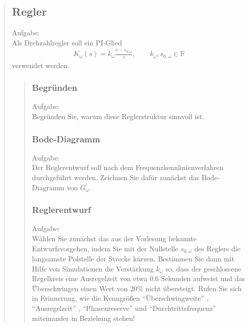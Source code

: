 \begin{quote}
\begin{quote}
        
	\end{quote}
	
	\subsection{Regler}
    Aufgabe:\\
    Als Drehzahlregler soll ein PI-Glied\\
    \begin{equation*}
        \begin{split}
            K_\omega (s) = k_\omega \frac{s-s_{0,\omega}}{s}, \hspace{2em} k_\omega, s_{0,\omega} \in \mathbb{R}
        \end{split}
    \end{equation*}
    verwendet werden.
	\begin{quote}
		
		\subsubsection{Begründen}
        Aufgabe:\\
        Begründen Sie, warum diese Reglerstruktur sinnvoll ist.\\
		\begin{quote}
			
		\end{quote}
		
		\subsubsection{Bode-Diagramm}
        Aufgabe:\\
        Der Reglerentwurf soll nach dem Frequenzkennlinienverfahren durchgeführt werden. Zeichnen Sie dafür zunächst
        das Bode-Diagramm von $G_\omega^{'}$.\\   
        \begin{quote}
                        
        \end{quote}

        \subsubsection{Reglerentwurf}
        Aufgabe:\\        
        Wählen Sie zunächst das aus der Vorlesung bekannte Entwurfsvorgehen, indem Sie mit der Nullstelle $s_{0,\omega}$
        des Reglers die langsamste Polstelle der Strecke kürzen. Bestimmen Sie dann mit Hilfe von Simulationen die
        Verstärkung $k_\omega$ so, dass der geschlossene Regelkreis eine Ausregelzeit von etwa $0.6$ Sekunden aufweist
        und das Ü̈berschwingen einen Wert von $20\%$ nicht übersteigt. Rufen Sie sich in Erinnerung, wie die
        Kenngrößen ``Überschwingweite'' , ``Ausregelzeit'' , ``Phasenreserve'' und ``Durchtrittsfrequenz''
        miteinander in Beziehung stehen!
		\begin{quote} 
		

\end{quote}
\end{quote}
\end{quote}
